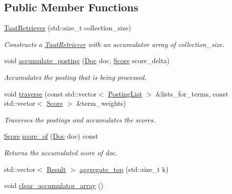 \subsection*{Public Member Functions}
\begin{DoxyCompactItemize}
\item 
\hyperlink{classngine_1_1query_1_1TaatRetriever_a7e9f75a28a1af01b28ec37df96c944fe}{Taat\+Retriever} (std\+::size\+\_\+t collection\+\_\+size)
\begin{DoxyCompactList}\small\item\em Constructs a \hyperlink{classngine_1_1query_1_1TaatRetriever}{Taat\+Retriever} with an accumulator array of collection\+\_\+size. \end{DoxyCompactList}\item 
void \hyperlink{classngine_1_1query_1_1TaatRetriever_af2a95fa756403a71243379451ddde620}{accumulate\+\_\+posting} (\hyperlink{structngine_1_1Doc}{Doc} doc, \hyperlink{structngine_1_1Score}{Score} score\+\_\+delta)
\begin{DoxyCompactList}\small\item\em Accumulates the posting that is being processed. \end{DoxyCompactList}\item 
void \hyperlink{classngine_1_1query_1_1TaatRetriever_a0eab909f9d3ac3d9f09752a581e8bf54}{traverse} (const std\+::vector$<$ \hyperlink{classngine_1_1PostingList}{Posting\+List} $>$ \&lists\+\_\+for\+\_\+terms, const std\+::vector$<$ \hyperlink{structngine_1_1Score}{Score} $>$ \&term\+\_\+weights)
\begin{DoxyCompactList}\small\item\em Traverses the postings and accumulates the scores. \end{DoxyCompactList}\item 
\hyperlink{structngine_1_1Score}{Score} \hyperlink{classngine_1_1query_1_1TaatRetriever_abebbcb23c11cbc5cc3628d8c5234e94b}{score\+\_\+of} (\hyperlink{structngine_1_1Doc}{Doc} doc) const
\begin{DoxyCompactList}\small\item\em Returns the accumulated score of doc. \end{DoxyCompactList}\item 
std\+::vector$<$ \hyperlink{structngine_1_1query_1_1Result}{Result} $>$ \hyperlink{classngine_1_1query_1_1TaatRetriever_a5b79dd87bef881e991d73f8cb42247b1}{aggregate\+\_\+top} (std\+::size\+\_\+t k)
\item 
void \hyperlink{classngine_1_1query_1_1TaatRetriever_a06a032c0bbde9724e4bd7e82d82d8534}{clear\+\_\+accumulator\+\_\+array} ()

\end{DoxyCompactItemize}
